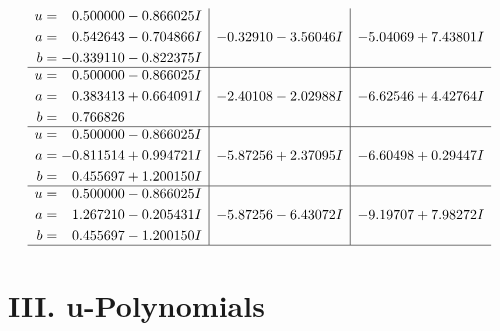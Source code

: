 \documentclass[1p]{elsarticle_modified}
\theoremstyle{definition}
\begin{document}
$$\begin{array}{c|c|c}
\begin{aligned}
u &= \phantom{-}0.500000 - 0.866025 I \\
a &= \phantom{-}0.542643 - 0.704866 I \\
b &= -0.339110 - 0.822375 I\end{aligned}
 & -0.32910 - 3.56046 I & -5.04069 + 7.43801 I \\ \hline\begin{aligned}
u &= \phantom{-}0.500000 - 0.866025 I \\
a &= \phantom{-}0.383413 + 0.664091 I \\
b &= \phantom{-}0.766826\phantom{ +0.000000I}\end{aligned}
 & -2.40108 - 2.02988 I & -6.62546 + 4.42764 I \\ \hline\begin{aligned}
u &= \phantom{-}0.500000 - 0.866025 I \\
a &= -0.811514 + 0.994721 I \\
b &= \phantom{-}0.455697 + 1.200150 I\end{aligned}
 & -5.87256 + 2.37095 I & -6.60498 + 0.29447 I \\ \hline\begin{aligned}
u &= \phantom{-}0.500000 - 0.866025 I \\
a &= \phantom{-}1.267210 - 0.205431 I \\
b &= \phantom{-}0.455697 - 1.200150 I\end{aligned}
 & -5.87256 - 6.43072 I & -9.19707 + 7.98272 I\\
 \hline 
 \end{array}$$\newpage
\newpage\renewcommand{\arraystretch}{1}
\centering \section*{ III. u-Polynomials}
\end{document}
